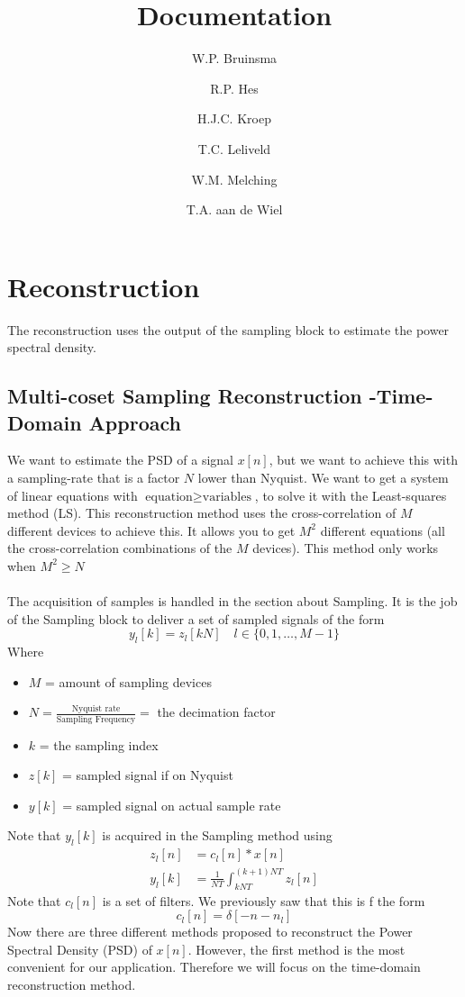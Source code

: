 \documentclass[oneside, a4paper, openany]{memoir}
\title{Documentation}
\author{W.P. Bruinsma \and R.P. Hes \and H.J.C. Kroep \and T.C. Leliveld \and W.M. Melching \and T.A. aan de Wiel}
\begin{document}
\chapter{Reconstruction}
The reconstruction uses the output of the sampling block to estimate the power spectral density.

\section{Multi-coset Sampling Reconstruction -Time-Domain Approach}
We want to estimate the PSD of a signal $x[n]$, but we want to achieve this with a sampling-rate that is a factor $N$ lower than Nyquist. We want to get a system of linear equations with $\text{equation}\geq \text{variables}$, to solve it with the Least-squares method (LS). This reconstruction method uses the cross-correlation of $M$ different devices to achieve this. 
It allows you to get $M^2$ different equations (all the cross-correlation combinations of the $M$ devices). This method only works when $M^2\geq N$\\
\\
The acquisition of samples is handled in the section about Sampling. It is the job of the Sampling block to deliver a set of sampled signals of the form 
$$y_l[k] = z_l[kN] \quad l \in \{0,1,\dots, M-1\}$$
Where
\begin{itemize}
\item $M$  = amount of sampling devices
\item $N = \frac{\text{Nyquist rate}}{\text{Sampling Frequency}} = $ the decimation factor
\item $k$ = the sampling index
\item $z[k]$ = sampled signal if on Nyquist
\item $y[k]$ = sampled signal on actual sample rate
\end{itemize}

Note that $y_l[k]$ is acquired in the Sampling method using
\begin{align}
z_l[n] &= c_l[n]\ast x[n]\\
y_l[k] &= \frac{1}{NT}\int_{kNT}^{(k+1)NT} z_l[n]
\end{align}
Note that $c_l[n]$ is a set of filters. We previously saw that this is f the form 
$$
c_l[n] = \delta[-n -n_l]
$$
Now there are three different methods proposed to reconstruct the Power Spectral Density (PSD) of $x[n]$. 
However, the first method is the most convenient for our application. 
Therefore we will focus on the time-domain reconstruction method.
\end{document}
